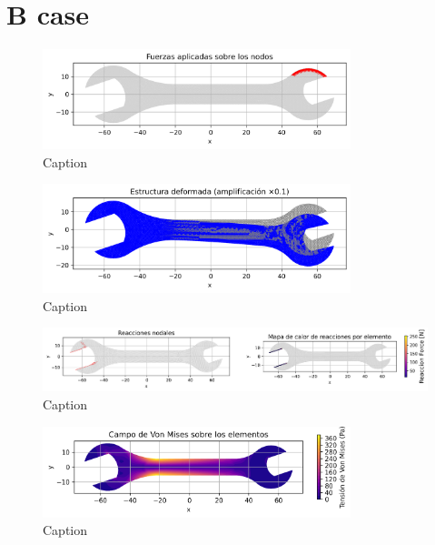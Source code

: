 \documentclass{article}  %
\begin{document}
\section{B case}

\begin{figure}[H]
  \centering
  \includegraphics[width=0.8\textwidth]{GRAFICOS/Case b_fuerzas.png}
  \caption{Caption}
  \label{fig:strain}
\end{figure}

\begin{figure}[H]
  \centering
  \includegraphics[width=0.8\textwidth]{GRAFICOS/Case b_deformada.png}
  \caption{Caption}
  \label{fig:stress}
\end{figure}

\begin{figure}[H]
  \centering
  \includegraphics[width=1\textwidth]{GRAFICOS/Case b_deformada_reacciones.png}
  \caption{Caption}
  \label{fig:principal}
\end{figure}

\begin{figure}[H]
  \centering
  \includegraphics[width=0.8\textwidth]{GRAFICOS/Case b_von_mises.png}
  \caption{Caption}
  \label{fig:principal}
\end{figure}
\end{document}
